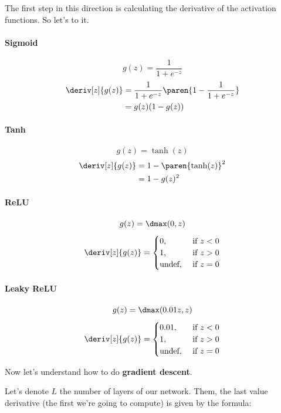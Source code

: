 \documentclass[12pt, a4paper, oneside]{book}
\begin{document}
The first step in this direction is calculating the derivative of the activation
functions. So let's to it.

\paragraph{Sigmoid}%
\label{par:sigmoid}

\[
    g(z)=\dfrac{1}{1+e^{-z}}
\]
\begin{align*}
    \deriv[z]{g(z)}&=\dfrac{1}{1+e^{-z}}\paren{1-\dfrac{1}{1+e^{-z}}} \\
                   &= g(z)(1-g(z))
\end{align*}

\paragraph{Tanh}%
\label{par:tanh}

\[
    g(z)=\tanh(z)
\]
\begin{align*}
    \deriv[z]{g(z)}&=1-\paren{\tanh(z)}^2 \\
                   &=1-g(z)^2
\end{align*}

\paragraph{ReLU}%
\label{par:relu}

\[
    g(z)=\dmax(0,z)
\]
\[
    \deriv[z]{g(z)}=\begin{cases}
        0, &\text{ if }z<0 \\
        1, &\text{ if }z>0 \\
        \text{undef}, &\text{ if }z=0
    \end{cases}
\]

\paragraph{Leaky ReLU}%
\label{par:leaky_relu}

\[
    g(z)=\dmax(0.01z,z)
\]
\[
    \deriv[z]{g(z)}=\begin{cases}
        0.01, &\text{ if }z<0 \\
        1, &\text{ if }z>0 \\
        \text{undef}, &\text{ if }z=0
    \end{cases}
\]

Now let's understand how to do \textbf{gradient descent}.

Let's denote $L$ the number of layers of our network. Them, the last value
derivative (the first we're going to compute) is given by the formula:
\end{document}
